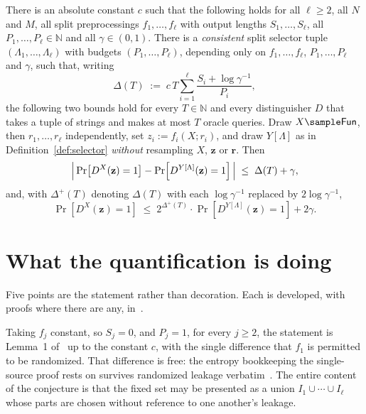 \documentclass{conjura-conjecture}
\newcommand{\Fun}{\mathsf{Fun}}
\newcommand{\Prob}[1]{\Pr\!\left[#1\right]}
\newcommand{\vz}{\mathbf{z}}
\newcommand{\vr}{\mathbf{r}}
\begin{document}
\begin{conjecture}\label{conj:main}
There is an absolute constant $c$ such that the following holds for all
$\ell \ge 2$, all $N$ and $M$, all split preprocessings
$f_1,\dots,f_\ell$ with output lengths $S_1,\dots,S_\ell$, all
$P_1,\dots,P_\ell \in \mathbb{N}$ and all $\gamma \in (0,1)$. There is a
\emph{consistent} split selector tuple $(\Lambda_1,\dots,\Lambda_\ell)$
with budgets $(P_1,\dots,P_\ell)$, depending only on
$f_1,\dots,f_\ell$, $P_1,\dots,P_\ell$ and $\gamma$, such that, writing
\[
  \Delta(T) \;:=\;
  c\,T\sum_{i=1}^{\ell}\frac{S_i + \log\gamma^{-1}}{P_i} ,
\]
the following two bounds hold for every $T \in \mathbb{N}$ and every
distinguisher $D$ that takes a tuple of strings and makes at most $T$
oracle queries. Draw $X \sample \Fun$, then $r_1,\dots,r_\ell$
independently, set $z_i := f_i(X;r_i)$, and draw $Y[\Lambda]$ as in
Definition~\ref{def:selector} \emph{without} resampling $X$, $\vz$ or
$\vr$. Then
\[
  \Bigl|\, \Prob{D^{X}(\vz) = 1} - \Prob{D^{Y[\Lambda]}(\vz) = 1}\,\Bigr|
  \;\le\; \Delta(T) + \gamma ,
\]
and, with $\Delta^{+}(T)$ denoting $\Delta(T)$ with each
$\log\gamma^{-1}$ replaced by $2\log\gamma^{-1}$,
\[
  \Prob{D^{X}(\vz) = 1}
  \;\le\; 2^{\Delta^{+}(T)}\cdot\Prob{D^{Y[\Lambda]}(\vz) = 1} + 2\gamma .
\]
\end{conjecture}

\section{What the quantification is doing}\label{sec:remarks}

Five points are the statement rather than decoration. Each is developed,
with proofs where there are any, in~\cite{PP}.

\begin{remark}\label{rem:reduces}
Taking $f_j$ constant, so $S_j = 0$, and $P_j = 1$, for every $j \ge 2$,
the statement is Lemma~1 of~\cite{CDGS} up to the constant $c$, with the
single difference that $f_1$ is permitted to be randomized. That
difference is free: the entropy bookkeeping the single-source proof rests
on survives randomized leakage verbatim~\cite[Lem.~1]{PP}. The entire
content of the conjecture is that the fixed set may be presented as a
union $I_1 \cup \cdots \cup I_\ell$ whose parts are chosen without
reference to one another's leakage.
\end{remark}
\end{document}
